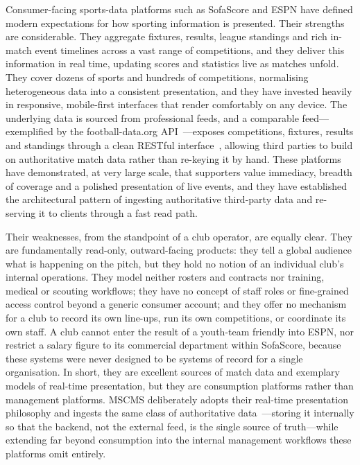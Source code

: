 Consumer-facing sports-data platforms such as SofaScore and ESPN have defined modern
expectations for how sporting information is presented. Their strengths are considerable.
They aggregate fixtures, results, league standings and rich in-match event timelines across a
vast range of competitions, and they deliver this information in real time, updating scores
and statistics live as matches unfold. They cover dozens of sports and hundreds of
competitions, normalising heterogeneous data into a consistent presentation, and they have
invested heavily in responsive, mobile-first interfaces that render comfortably on any device.
The underlying data is sourced from professional feeds, and a comparable feed---exemplified
by the football-data.org API~\cite{footballdata}---exposes competitions, fixtures, results and
standings through a clean RESTful interface~\cite{restapi}, allowing third parties to build on
authoritative match data rather than re-keying it by hand. These platforms have
demonstrated, at very large scale, that supporters value immediacy, breadth of coverage and
a polished presentation of live events, and they have established the architectural pattern of
ingesting authoritative third-party data and re-serving it to clients through a fast read path.

Their weaknesses, from the standpoint of a club operator, are equally clear. They are
fundamentally read-only, outward-facing products: they tell a global audience what is
happening on the pitch, but they hold no notion of an individual club's internal operations.
They model neither rosters and contracts nor training, medical or scouting workflows; they
have no concept of staff roles or fine-grained access control beyond a generic consumer
account; and they offer no mechanism for a club to record its own line-ups, run its own
competitions, or coordinate its own staff. A club cannot enter the result of a youth-team
friendly into ESPN, nor restrict a salary figure to its commercial department within
SofaScore, because these systems were never designed to be systems of record for a single
organisation. In short, they are excellent sources of match data and exemplary models of
real-time presentation, but they are consumption platforms rather than management
platforms. MSCMS deliberately adopts their real-time presentation philosophy and ingests
the same class of authoritative data~\cite{footballdata}---storing it internally so that the
backend, not the external feed, is the single source of truth---while extending far beyond
consumption into the internal management workflows these platforms omit entirely.

